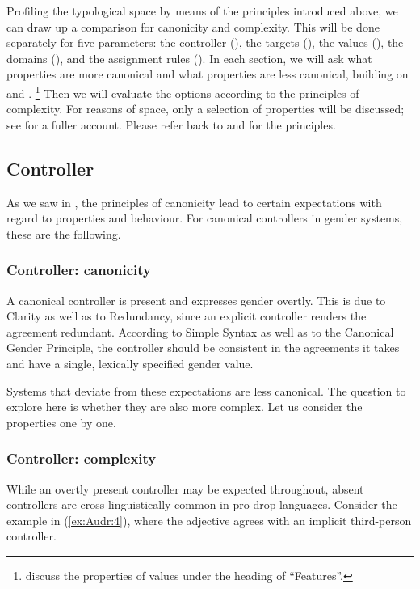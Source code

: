 \documentclass[output=collectionpaper]{langsci/langscibook}
\begin{document}
Profiling the typological space by means of the principles introduced above, we can draw up a comparison for canonicity and complexity. This will be done separately for five parameters: the controller (), the targets (), the values (), the domains (), and the assignment rules (). In each section, we will ask what properties are more canonical and what properties are less canonical, building on \citet{Corbett2006,Corbett2012} and \citet{Corbett2016}.%
\footnote{\cite[514--517]{Corbett2016} discuss the properties of values under the heading of ``Features''.} %
Then we will evaluate the options according to the principles of complexity. For reasons of space, only a selection of properties will be discussed; see \citet{Audring2017} for a fuller account. Please refer back to  and  for the principles.

\subsection{Controller}
\label{sec:Audr:3.2}

As we saw in , the principles of canonicity lead to certain expectations with regard to properties and behaviour. For canonical controllers in gender systems, these are the following.

\subsubsection{Controller: canonicity}

A canonical controller is present and expresses gender overtly. This is due to Clarity as well as to Redundancy, since an explicit controller renders the agreement redundant. According to Simple Syntax as well as to the Canonical Gender Principle, the controller should be consistent in the agreements it takes and have a single, lexically specified gender value.

Systems that deviate from these expectations are less canonical. The question to explore here is whether they are also more complex. Let us consider the properties one by one.

\subsubsection{Controller: complexity}

\fussy
While an overtly present controller may be expected throughout, absent controllers are cross-linguistically common in pro-drop languages. Consider the  example in (\ref{ex:Audr:4}), where the adjective agrees with an implicit third-person controller.
\sloppy 
\end{document}
